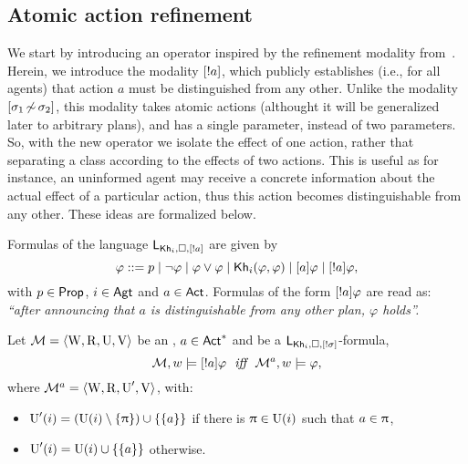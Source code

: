 \subsection{Atomic action refinement}
\label{subsec:atom-ref}

We start by introducing an operator inspired by the refinement modality from~. Herein, we introduce the modality $[!a]$, which publicly establishes (i.e., for all agents) that action $a$ must be distinguished from any other. Unlike the modality $[{\sigma_1{\,\not\sim\,}\sigma_2}]$, this modality takes atomic actions (althought it will be generalized later to arbitrary plans), and has a single parameter, instead of two parameters. So, with the new operator we isolate the effect of one action, rather that separating a class according to the effects of two actions. This is useful as for instance, an uninformed agent may receive a concrete information about the actual effect of a particular action, thus this action becomes distinguishable from any other. These ideas are formalized below.

\begin{definition}\label{def:ssrefsyntax}
Formulas of the language $\mathsf{L}_{{\sf Kh}_i,\square,[!a]}$ are given by
\[
\varphi ::= p \mid \neg\varphi \mid \varphi\vee\varphi \mid {\sf Kh}_i(\varphi,\varphi) \mid [a]\varphi \mid [!a]\varphi,
\]
with $p \in {\rm \sf Prop}$, $i\in{\rm \sf Agt}$ and $a \in {\rm \sf Act}$. Formulas of the form $[!a]\varphi$ are read as: \emph{``after announcing that $a$ is distinguishable from any other plan, $\varphi$ holds''.} 
\end{definition}

\begin{definition}\label{def:ssrefsemantics}
Let $\mathcal{M} = \langle \operatorname{W}, \operatorname{R}, \operatorname{U}, \operatorname{V} \rangle$ be an \ults, $a \in {\rm \sf Act}^*$ and  be a $\mathsf{L}_{{\sf Kh}_i,\square,[!\sigma]}$-formula,
\[
\modults,w \models \srefbox{a}\varphi \ \ \iff \ \ \modults^a,w \models \varphi,
\] 
where $\mathcal{M}^a = \langle \operatorname{W},\operatorname{R},\operatorname{U}',\operatorname{V} \rangle$, with:
\begin{itemize}
\item $\operatorname{U}'(i) = (\operatorname{U}(i) \setminus \{ \uppi \}) \cup \{ \{ a \} \}$ if there is $\uppi \in \operatorname{U}(i)$ such that $a \in \uppi$,
\item $\operatorname{U}'(i) = \operatorname{U}(i) \cup \{ \{ a \} \}$ otherwise.
\end{itemize}
\end{definition}

